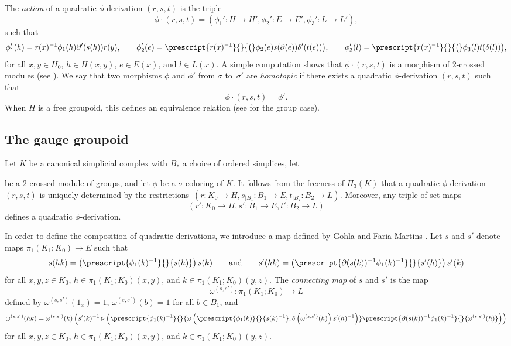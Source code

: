 \documentclass[a4paper, oneside]{amsart}
\numberwithin{equation}{subsection}
\theoremstyle{referencedlemma}
\theoremstyle{plain} %
\theoremstyle{remark}
\begin{document}
The \emph{action} of a quadratic $\phi$-derivation $(r,s,t)$ is the triple
$$
\phi\cdot (r,s,t) = (\phi_1' \colon H\to H', \phi_2'\colon E \to E', \phi_3'\colon L\to L'),
$$
such that 
$$
\phi'_1(h) = r(x)^{-1}\phi_1(h)\partial' (s(h))r(y), \quad \quad \phi'_2(e) = \prescript{r(x)^{-1}}{}{\big(}\phi_2(e) s(\partial(e))\delta'( t(e))\big), \quad \quad \phi'_3(l) = \prescript{r(x)^{-1}}{}{\big(} \phi_3(l) t(\delta(l))\big),
$$
for all $x, y \in H_0$, $h\in H(x,y)$, $e\in E(x)$,  and $l \in L(x)$.  A simple computation shows that $\phi\cdot (r,s,t)$ is a morphism of 2-crossed modules (see  \cite[Theorem 2.13]{martins_fundamental_2011}).  We say that two morphisms $\phi$ and $\phi'$ from $\sigma$ to~$\sigma'$ are \emph{homotopic} if there exists a quadratic $\phi$-derivation $(r,s,t)$ such that
$$
\phi\cdot (r,s,t) = \phi'.
$$
When $H$ is a free groupoid, this defines an equivalence relation (see \cite{gohla_pointed_2013} for the group case). 

\subsection{The gauge groupoid}\label{gauge-groupoid} Let $K$ be a canonical simplicial complex with $B_*$ a choice of ordered simplices,  letbe a 2-crossed module of groups, and let $\phi$ be a $\sigma$-coloring of $K$. It follows from the freeness of $\Pi_3(K)$ that a quadratic $\phi$-derivation $(r,s,t)$ is uniquely determined by the restrictions~\mbox{$(r\colon K_0\to H,  s_{\vert B_1}\colon B_1 \to E, t_{\vert B_2}\colon B_2\to L)$}. Moreover, any triple of set maps
$$
(r'\colon K_0\to H, s'\colon B_1\to E, t'\colon B_2\to L)
$$ defines a quadratic $\phi$-derivation.  

In order to define the composition of quadratic derivations, we introduce a map defined by Gohla and Faria Martins \cite{gohla_pointed_2013}. Let $s$ and $s'$ denote maps $\pi_1(K_1; K_0)\to E$ such that 
$$
s(hk) = \left(\prescript{\phi_1(k)^{-1}}{}{s(h)}\right)s(k)\quad \quad \text{and}\quad \quad s'(hk) = \left(\prescript{\partial (s(k))^{-1}\phi_1(k)^{-1}}{}{s'(h)}\right)s'(k)
$$
for all $x,y,z \in K_0$, $h\in \pi_1(K_1; K_0)(x,y)$, and $k\in \pi_1(K_1; K_0)(y,z)$.  The \emph{connecting map} of $s$ and $s'$ is the map 
$$
\omega^{(s,s')}\colon \pi_1(K_1; K_0)\to L
$$
defined by $\omega^{(s, s')}(1_x) = 1$, $\omega^{(s,s')}(b) = 1$ for all $b\in B_1$, and 
$$
\omega^{(s,s')}(hk) = \omega^{(s,s')}(k)\left(s'(k)^{-1}\triangleright\left( \prescript{\phi_1(k)^{-1}}{}{\omega\left(\prescript{\phi_1(k)}{}{s(k)^{-1}}, \delta\left( \omega^{(s,s')}(h)\right) s'(h)^{-1}\right)}\prescript{\partial (s(k))^{-1}\phi_1(k)^{-1}}{}{\omega^{(s,s')}(h)}  \right)\right)
$$
for all $x,y,z \in K_0$, $h\in \pi_1(K_1; K_0)(x,y)$, and $k\in \pi_1(K_1; K_0)(y,z)$. 
\end{document}
